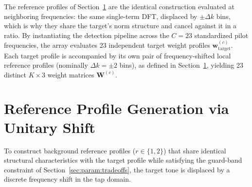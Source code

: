The reference profiles of Section~\ref{sec:param:refs} are the identical construction evaluated at neighboring frequencies: the same single-term DFT, displaced by $\pm \Delta k$ bins, which is why they share the target's norm structure and cancel against it in a ratio. By instantiating the detection pipeline across the $C = 23$ standardized pilot frequencies, the array evaluates 23 independent target weight profiles $\mathbf{w}_{\text{target}}^{(c)}$. Each target profile is accompanied by its own pair of frequency-shifted local reference profiles (nominally $\Delta k = \pm 2$ bins), as defined in Section~\ref{sec:param:refs}, yielding 23 distinct $K \times 3$ weight matrices $\mathbf{W}^{(c)}$.

\section{Reference Profile Generation via Unitary Shift}
\label{sec:param:refs}

To construct background reference profiles ($r \in \{1, 2\}$) that share identical structural characteristics with the target profile while satisfying the guard-band constraint of Section~\ref{sec:param:tradeoffs}, the target tone is displaced by a discrete frequency shift in the tap domain.

